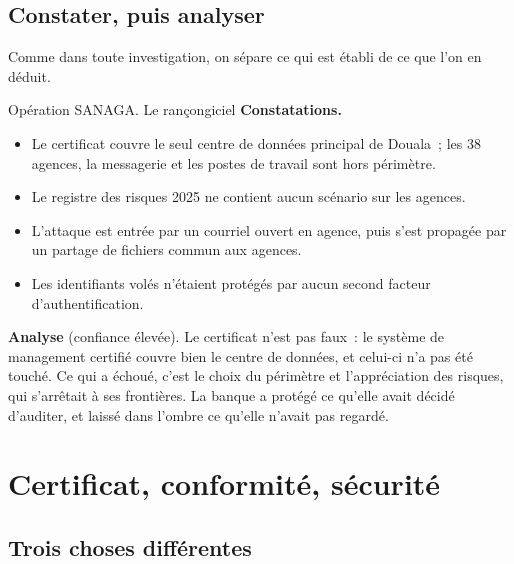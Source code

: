 \subsection{Constater, puis analyser}

Comme dans toute investigation, on sépare ce qui est établi de ce que l'on
en déduit.

\begin{boxscenario}{Opération SANAGA. Le rançongiciel}
\textbf{Constatations.}
\begin{itemize}
    \item Le certificat couvre le seul centre de données principal de
          Douala~; les 38 agences, la messagerie et les postes de travail sont
          hors périmètre.
    \item Le registre des risques 2025 ne contient aucun scénario sur les
          agences.
    \item L'attaque est entrée par un courriel ouvert en agence, puis s'est
          propagée par un partage de fichiers commun aux agences.
    \item Les identifiants volés n'étaient protégés par aucun second facteur
          d'authentification.
\end{itemize}

\textbf{Analyse} (confiance élevée). Le certificat n'est pas faux~: le
système de management certifié couvre bien le centre de données, et celui-ci
n'a pas été touché. Ce qui a échoué, c'est le choix du périmètre et
l'appréciation des risques, qui s'arrêtait à ses frontières. La banque a
protégé ce qu'elle avait décidé d'auditer, et laissé dans l'ombre ce qu'elle
n'avait pas regardé.
\end{boxscenario}

\section{Certificat, conformité, sécurité}
\label{sec:pro-certificat}

\subsection{Trois choses différentes}

